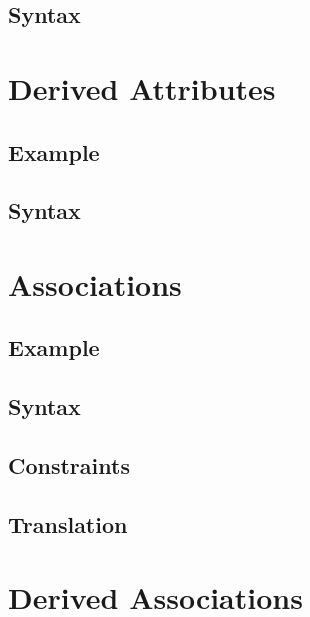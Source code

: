 \documentclass[a4paper,oneside,12pt, extrafontsizes]{memoir}
\begin{document}
    \section{Syntax}
    

  \chapter{Derived Attributes}
  \label{ch:derived-attributes}
  

    \section{Example}
    

    \section{Syntax}
    

  \chapter{Associations}
  \label{ch:associations}
  

    \section{Example}
    

    \section{Syntax}
    

    \section{Constraints}
    

    \section{Translation}
    

  \chapter{Derived Associations}
  \label{ch:derived-associations}
  
\end{document}
